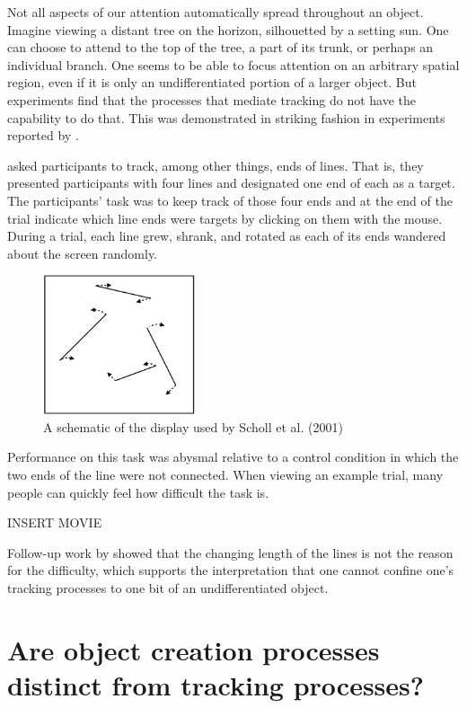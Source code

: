 \documentclass[]{book}
\begin{document}
Not all aspects of our attention automatically spread throughout an object. Imagine viewing a distant tree on the horizon, silhouetted by a setting sun. One can choose to attend to the top of the tree, a part of its trunk, or perhaps an individual branch. One seems to be able to focus attention on an arbitrary spatial region, even if it is only an undifferentiated portion of a larger object. But experiments find that the processes that mediate tracking do not have the capability to do that. This was demonstrated in striking fashion in experiments reported by \citep{schollWhatVisualObject2001}.

\citet{schollWhatVisualObject2001} asked participants to track, among other things, ends of lines. That is, they presented participants with four lines and designated one end of each as a target. The participants' task was to keep track of those four ends and at the end of the trial indicate which line ends were targets by clicking on them with the mouse. During a trial, each line grew, shrank, and rotated as each of its ends wandered about the screen randomly.

\begin{figure}
\centering
\includegraphics[width=0.4\textwidth,height=\textheight]{imagesForRmd/linesSchollPylyshynFeldman_madeByHolcombe.png}
\caption{A schematic of the display used by Scholl et al. (2001)}
\end{figure}

Performance on this task was abysmal relative to a control condition in which the two ends of the line were not connected. When viewing an example trial, many people can quickly feel how difficult the task is.

INSERT MOVIE

Follow-up work by \citet{howeCanAttentionBe2012} showed that the changing length of the lines is not the reason for the difficulty, which supports the interpretation that one cannot confine one's tracking processes to one bit of an undifferentiated object.

\hypertarget{are-object-creation-processes-distinct-from-tracking-processes}{%
\section{Are object creation processes distinct from tracking processes?}\label{are-object-creation-processes-distinct-from-tracking-processes}}
\end{document}
